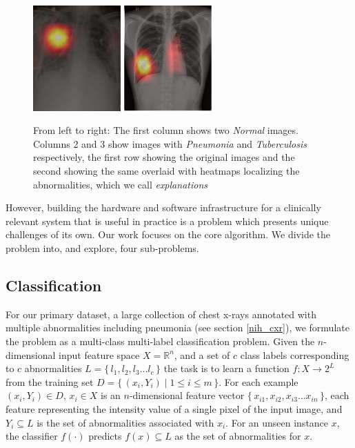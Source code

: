 \documentclass[12pt,oneside,a4paper]{report}
\begin{document}
\begin{figure}
  \includegraphics[width=0.3\textwidth]{images/consolidation_heatmap}\hspace{0.01\textwidth}%
  \includegraphics[width=0.3\textwidth]{images/TB_heatmap}
  \caption{From left to right: The first column shows two \emph{Normal} images.
    Columns 2 and 3 show images with \emph{Pneumonia} and \emph{Tuberculosis}
    respectively, the first row showing the original images and the second
    showing the same overlaid with heatmaps localizing the abnormalities, which
    we call \emph{explanations}}
  \label{basic_examples}
\end{figure}

However, building the hardware and software infrastructure for a clinically
relevant system that is useful in practice is a problem which presents unique
challenges of its own. Our work focuses on the core algorithm. We divide the
problem into, and explore, four sub-problems.
\subsection{Classification}
For our primary dataset, a large collection of chest x-rays annotated with
multiple abnormalities including pneumonia \cite{Wang2017a} (see section
\ref{nih_cxr}), we formulate the problem as a multi-class multi-label
classification problem. Given the $n$-dimensional input feature space $X =
\mathbb{R} ^n$, and a set of $c$ class labels corresponding to $c$ abnormalities
$L = \{\,l_1 ,l_2 ,l_3 \dots l_c\,\}$ the task is to learn a function $f:X
\rightarrow 2^L$ from the training set $D = \{\,(x_i, Y_i) \mid 1 \leq i \leq m
\,\}$. For each example $(x_i, Y_i) \in D$, $x_i \in X$ is an $n$-dimensional
feature vector $\{\, x_{i1}, x_{i2}, x_{i3} \dots x_{in} \,\}$, each feature
representing the intensity value of a single pixel of the input image, and $Y_i
\subseteq L $ is the set of abnormalities associated with $x_i$. For an unseen
instance $x$, the classifier $f(\cdot)$ predicts $f(x) \subseteq L$ as the set
of abnormalities for
$x$.\\
\end{document}
